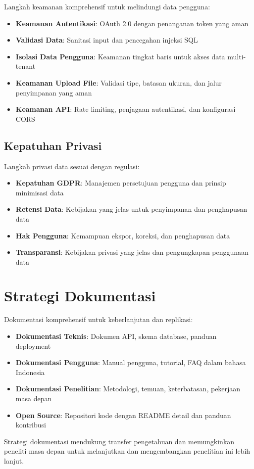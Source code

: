 Langkah keamanan komprehensif untuk melindungi data pengguna:

\begin{itemize}
\item \textbf{Keamanan Autentikasi}: OAuth 2.0 dengan penanganan token yang aman
\item \textbf{Validasi Data}: Sanitasi input dan pencegahan injeksi SQL
\item \textbf{Isolasi Data Pengguna}: Keamanan tingkat baris untuk akses data multi-tenant
\item \textbf{Keamanan Upload File}: Validasi tipe, batasan ukuran, dan jalur penyimpanan yang aman
\item \textbf{Keamanan API}: Rate limiting, penjagaan autentikasi, dan konfigurasi CORS
\end{itemize}

\subsection{Kepatuhan Privasi}

Langkah privasi data sesuai dengan regulasi:

\begin{itemize}
\item \textbf{Kepatuhan GDPR}: Manajemen persetujuan pengguna dan prinsip minimisasi data
\item \textbf{Retensi Data}: Kebijakan yang jelas untuk penyimpanan dan penghapusan data
\item \textbf{Hak Pengguna}: Kemampuan ekspor, koreksi, dan penghapusan data
\item \textbf{Transparansi}: Kebijakan privasi yang jelas dan pengungkapan penggunaan data
\end{itemize}

\section{Strategi Dokumentasi}

Dokumentasi komprehensif untuk keberlanjutan dan replikasi:

\begin{itemize}
\item \textbf{Dokumentasi Teknis}: Dokumen API, skema database, panduan deployment
\item \textbf{Dokumentasi Pengguna}: Manual pengguna, tutorial, FAQ dalam bahasa Indonesia
\item \textbf{Dokumentasi Penelitian}: Metodologi, temuan, keterbatasan, pekerjaan masa depan
\item \textbf{Open Source}: Repositori kode dengan README detail dan panduan kontribusi
\end{itemize}

Strategi dokumentasi mendukung transfer pengetahuan dan memungkinkan peneliti masa depan untuk melanjutkan dan mengembangkan penelitian ini lebih lanjut.